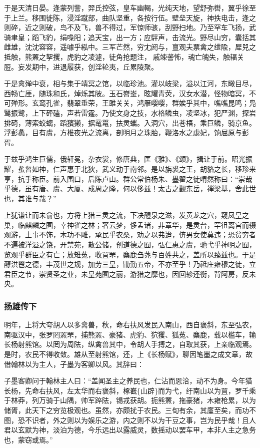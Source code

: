 \documentclass[]{article}
\begin{document}
于是天清日晏。逢蒙列訾，羿氏控弦，皇车幽輵，光纯天地，望舒弥辔，翼乎徐至于上兰。移围徙陈，浸淫蹴部，曲队坚重，各按行伍。壁垒天旋，神抶电击，逢之则碎，近之则破，鸟不及飞，兽不得过，军惊师骇，刮野扫地。乃至罕车飞扬，武骑聿皇；蹈飞豹，绢嘄阳；追天宝，出一方；应駍声，击流光。野尽山穷，囊括其雌雄，沈沈容容，遥噱乎紭中。三军芒然，穷冘阏与，亶观夫票禽之绁隃，犀兕之抵触，熊罴之挐攫，虎豹之凌遽，徒角抢题注，戚竦詟怖，魂亡魄失，触辐关脰。妄发期中，进退履获，创淫轮夷，丘累陵聚。

于是禽殚中衰，相与集于靖冥之馆，以临珍池。灌以岐梁，溢以江河，东瞰目尽，西畅亡厓，随珠和氏，焯烁其陂。玉石嶜崟，眩耀青荧，汉女水潜，怪物暗冥，不可殚形。玄鸾孔雀，翡翠垂荣，王雎关关，鸿雁嘤嘤，群娭乎其中，噍噍昆鸣；凫鹥振鹭，上下砰磕，声若雷霆。乃使文身之技，水格鳞虫，凌坚冰，犯严渊，探岩排碕，薄索蛟螭，蹈獱獭，据鼋鼍，抾灵蠵。入洞穴，出苍梧，乘巨鳞，骑京鱼。浮彭蠡，目有虞，方椎夜光之流离，剖明月之珠胎，鞭洛水之虙妃，饷屈原与彭胥。

于兹乎鸿生巨儒，俄轩冕，杂衣裳，修唐典，匡《雅》、《颂》，揖让于前。昭光振耀，蚃曶如神，仁声惠于北狄，武义动于南邻。是以旃裘之王，胡貉之长，移珍来享，抗手称臣。前入围口，后陈卢山。群公常伯杨朱、墨翟之徒喟然称曰：``崇哉乎德，虽有唐、虞、大厦、成周之隆，何以侈兹！太古之觐东岳，禅梁基，舍此世也，其谁与哉？''

上犹谦让而未俞也，方将上猎三灵之流，下决醴泉之滋，发黄龙之穴，窥凤皇之巢，临麒麟之囿，幸神雀之林；奢云梦，侈孟诸，非章华，是灵台，罕徂离宫而辍观游，土事不饰，木功不雕，承民乎农桑，劝之以弗迨，侪男女使莫违；恐贫穷者不遍被洋溢之饶，开禁苑，散公储，创道德之囿，弘仁惠之虞，驰弋乎神明之囿，览观乎群臣之有亡；放雉菟，收罝罘，麋鹿刍荛与百姓共之，盖所以臻兹也。于是醇洪鬯之德，丰茂世之规，加劳三皇，勖勤五帝，不亦至乎！乃祗庄雍穆之徒，立君臣之节，崇贤圣之业，未皇苑囿之丽，游猎之靡也，因回轸还衡，背阿房，反未央。

\hypertarget{header-n5900}{%
\subsubsection{扬雄传下}\label{header-n5900}}

明年，上将大夸胡人以多禽兽，秋，命右扶风发民入南山，西自褒斜，东至弘农，南驱汉中，张罗罔罴罘，捕熊罴、豪猪、虎豹、狖玃、狐菟、麋鹿，载以槛车，输长杨射熊馆。以罔为周阹，纵禽兽其中，令胡人手搏之，自取其获，上亲临观焉。是时，农民不得收敛。雄从至射熊馆，还，上《长杨赋》，聊因笔墨之成文章，故借翰林以为主人，子墨为客卿以风。其辞曰：

子墨客卿问于翰林主人曰：``盖闻圣主之养民也，仁沾而恩洽，动不为身。今年猎长杨，先命右扶风，左太华而右褒斜，椓嶻\{山辟\}而为弋，纡南山以为罝，罗千乘于林莽，列万骑于山隅，帅军踤阹，锡戎获胡。扼熊罴，拖豪猪，木雍枪累，以为储胥，此天下之穷览极观也。虽然，亦颇扰于农民。三旬有余，其廑至矣，而功不图，恐不识者，外之则以为娱乐之游，内之则不以为干豆之事，岂为民乎哉！且人君以玄默为神，淡泊为德，今乐远出以露威灵，数摇动以罢车甲，本非人主之急务也，蒙窃或焉。''
\end{document}
